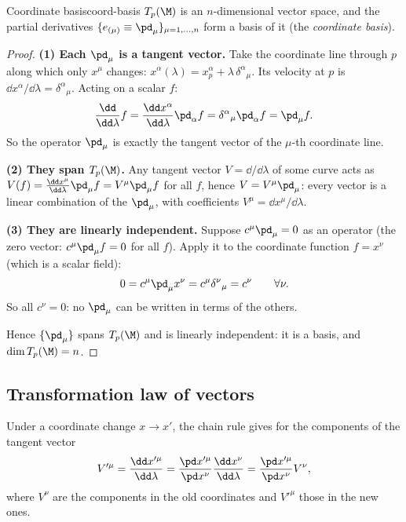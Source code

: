 \begin{theorem}{Coordinate basis}{coord-basis}
$T_p(\M)$ is an $n$-dimensional vector space, and the partial derivatives $\{e_{(\mu)}\equiv\pd_\mu\}_{\mu=1,\dots,n}$ form a basis of it (the \emph{coordinate basis}).
\end{theorem}
\begin{proof}
\textbf{(1) Each $\pd_\mu$ is a tangent vector.} Take the coordinate line through $p$ along which only $x^\mu$ changes: $x^\alpha(\lambda)=x^\alpha_p+\lambda\,\delta^\alpha{}_\mu$. Its velocity at $p$ is $\dd x^\alpha/\dd\lambda=\delta^\alpha{}_\mu$. Acting on a scalar $f$:
\[
  \frac{\dd}{\dd\lambda}f=\frac{\dd x^\alpha}{\dd\lambda}\pd_\alpha f=\delta^\alpha{}_\mu\pd_\alpha f=\pd_\mu f .
\]
So the operator $\pd_\mu$ is exactly the tangent vector of the $\mu$-th coordinate line.

\textbf{(2) They span $T_p(\M)$.} Any tangent vector $V=\dd/\dd\lambda$ of some curve acts as $V(f)=\frac{\dd x^\mu}{\dd\lambda}\pd_\mu f=V^\mu\pd_\mu f$ for all $f$, hence $V=V^\mu\pd_\mu$: every vector is a linear combination of the $\pd_\mu$, with coefficients $V^\mu=\dd x^\mu/\dd\lambda$.

\textbf{(3) They are linearly independent.} Suppose $c^\mu\pd_\mu=0$ as an operator (the zero vector: $c^\mu\pd_\mu f=0$ for all $f$). Apply it to the coordinate function $f=x^\nu$ (which is a scalar field):
\[
  0=c^\mu\pd_\mu x^\nu=c^\mu\delta^\nu{}_\mu=c^\nu\qquad\forall\nu .
\]
So all $c^\nu=0$: no $\pd_\mu$ can be written in terms of the others.

Hence $\{\pd_\mu\}$ spans $T_p(\M)$ and is linearly independent: it is a basis, and $\dim T_p(\M)=n$.
\end{proof}

\subsection{Transformation law of vectors}

Under a coordinate change $x\to x'$, the chain rule gives for the components of the tangent vector
\begin{equation}
  V'^\mu=\frac{\dd x'^\mu}{\dd\lambda}=\frac{\pd x'^\mu}{\pd x^\nu}\frac{\dd x^\nu}{\dd\lambda}=\frac{\pd x'^\mu}{\pd x^\nu}V^\nu ,
\end{equation}
where $V^\nu$ are the components in the old coordinates and $V'^\mu$ those in the new ones.

